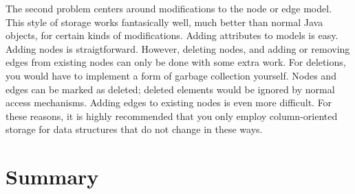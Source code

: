 The second problem centers around modifications to the node or edge model. This
style of storage works fantasically well, much better than normal Java objects,
for certain kinds of modifications. Adding attributes to models is easy.
Adding nodes is straigtforward. However, deleting nodes, and adding or
removing edges from existing nodes can only be done with some extra work. For
deletions, you would have to implement a form of garbage collection yourself.
Nodes and edges can be marked as deleted; deleted elements would be ignored by
normal access mechanisms. Adding edges to existing nodes is even more difficult.
For these reasons, it is highly recommended that you only employ column-oriented
storage for data structures that do not change in these ways.


\section{Summary}





